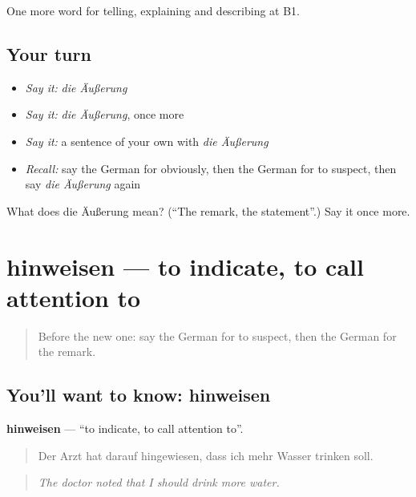 \begin{grammarlens}[title={What you've built}]
One more word for telling, explaining and describing at B1.
\end{grammarlens}

\subsection*{Your turn}
\begin{itemize}
\raggedright
  \item \emph{Say it:} \emph{die Äußerung}
  \item \emph{Say it:} \emph{die Äußerung}, once more
  \item \emph{Say it:} a sentence of your own with \emph{die Äußerung}
  \item \emph{Recall:} say the German for obviously, then the German for to suspect, then say \emph{die Äußerung} again
\end{itemize}

\begin{tcolorbox}[breakable,colback=teal!4,colframe=teal!35!black,title={Before you move on}]
What does die Äußerung mean? (\textquotedblleft{}The remark, the statement\textquotedblright{}.) Say it once more.
\end{tcolorbox}
\section[hinweisen]{hinweisen — to indicate, to call attention to}

\label{lesson:GE-C339-hinweisen}



\begin{quote}
Before the new one: say the German for to suspect, then the German for the remark.
\end{quote}

\subsection*{You'll want to know: hinweisen}
\textbf{hinweisen} — \textquotedblleft{}to indicate, to call attention to\textquotedblright{}.

\begin{quote}
Der Arzt hat darauf hingewiesen, dass ich mehr Wasser trinken soll.
\end{quote}

\begin{quote}
\emph{The doctor noted that I should drink more water.}
\end{quote}

